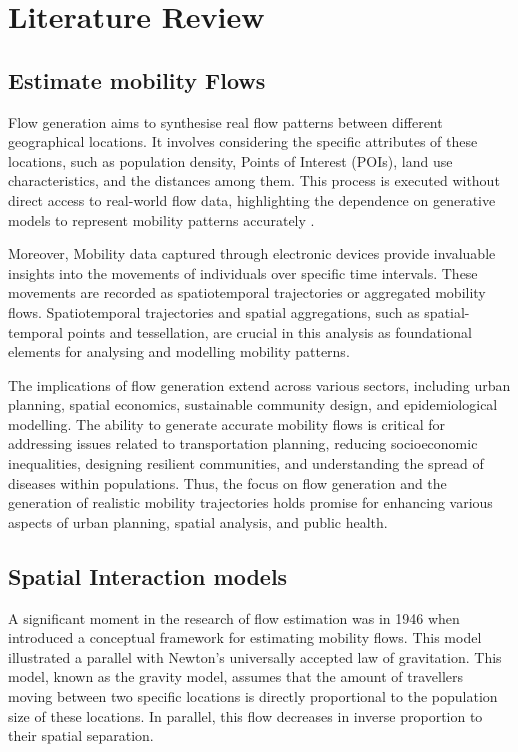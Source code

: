 \chapter{Literature Review}
\label{chapterlabel2}
    \section{Estimate mobility Flows} 

     Flow generation aims to synthesise real flow patterns between different geographical locations. It involves considering the specific attributes of these locations, such as population density, Points of Interest (POIs), land use characteristics, and the distances among them. This process is executed without direct access to real-world flow data, highlighting the dependence on generative models to represent mobility patterns accurately \citep{lucaSurveyDeepLearning2021}.
    
    Moreover, Mobility data captured through electronic devices provide invaluable insights into the movements of individuals over specific time intervals\citep{lucaSurveyDeepLearning2021}. These movements are recorded as spatiotemporal trajectories or aggregated mobility flows. Spatiotemporal trajectories and spatial aggregations, such as spatial-temporal points and tessellation, are crucial in this analysis as foundational elements for analysing and modelling mobility patterns\citep{lucaSurveyDeepLearning2021, siminiDeepGravityModel2021}.
    
    The implications of flow generation extend across various sectors, including urban planning, spatial economics, sustainable community design, and epidemiological modelling. The ability to generate accurate mobility flows is critical for addressing issues related to transportation planning, reducing socioeconomic inequalities, designing resilient communities, and understanding the spread of diseases within populations\citep{lucaSurveyDeepLearning2021}. Thus, the focus on flow generation and the generation of realistic mobility trajectories holds promise for enhancing various aspects of urban planning, spatial analysis, and public health.
      
    \section{Spatial Interaction models}

    A significant moment in the research of flow estimation was in 1946 when \cite{zipfP1P2Hypothesis1946} introduced a conceptual framework for estimating mobility flows\citep{siminiDeepGravityModel2021, wilkinsonSpatialInteractionModels2023}. This model illustrated a parallel with Newton's universally accepted law of gravitation. This model, known as the gravity model, assumes that the amount of travellers moving between two specific locations is directly proportional to the population size of these locations. In parallel, this flow decreases in inverse proportion to their spatial separation\citep{wilsonFamilySpatialInteraction1971b}.
        
